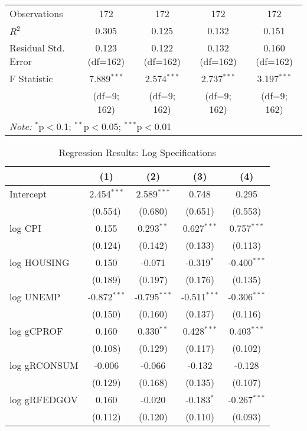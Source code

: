 \begin{table}[H]
\begin{tabular}{@{\extracolsep{5pt}}lcccc}
\hline
Observations & 172 & 172 & 172 & 172 \\
$R^2$ & 0.305 & 0.125 & 0.132 & 0.151 \\
Residual Std. Error & 0.123 (df=162) & 0.122 (df=162) & 0.132 (df=162) & 0.160 (df=162) \\
F Statistic & 7.889$^{***}$ & 2.574$^{***}$ & 2.737$^{***}$ & 3.197$^{***}$ \\
            & (df=9; 162) & (df=9; 162) & (df=9; 162) & (df=9; 162) \\
\hline
\hline
\multicolumn{5}{l}{\textit{Note:} $^{*}$p$<$0.1; $^{**}$p$<$0.05; $^{***}$p$<$0.01} \\
\end{tabular}
\end{table}

\begin{table}[H]
\centering
\caption{Regression Results: Log Specifications}
\begin{tabular}{@{\extracolsep{5pt}}lcccc}
\hline
\hline
& (1) & (2) & (3) & (4) \\
\hline
Intercept & 2.454$^{***}$ & 2.589$^{***}$ & 0.748 & 0.295 \\
          & (0.554) & (0.680) & (0.651) & (0.553) \\

log CPI & 0.155 & 0.293$^{**}$ & 0.627$^{***}$ & 0.757$^{***}$ \\
              & (0.124) & (0.142) & (0.133) & (0.113) \\

log HOUSING & 0.150 & -0.071 & -0.319$^{*}$ & -0.400$^{***}$ \\
                  & (0.189) & (0.197) & (0.176) & (0.135) \\

log UNEMP & -0.872$^{***}$ & -0.795$^{***}$ & -0.511$^{***}$ & -0.306$^{***}$ \\
                & (0.150) & (0.160) & (0.137) & (0.116) \\

log gCPROF & 0.160 & 0.330$^{**}$ & 0.428$^{***}$ & 0.403$^{***}$ \\
                 & (0.108) & (0.129) & (0.117) & (0.102) \\

log gRCONSUM & -0.006 & -0.066 & -0.132 & -0.128 \\
                   & (0.129) & (0.168) & (0.135) & (0.107) \\

log gRFEDGOV & 0.160 & -0.020 & -0.183$^{*}$ & -0.267$^{***}$ \\
                   & (0.112) & (0.120) & (0.110) & (0.093) \\


\end{tabular}
\end{table}
